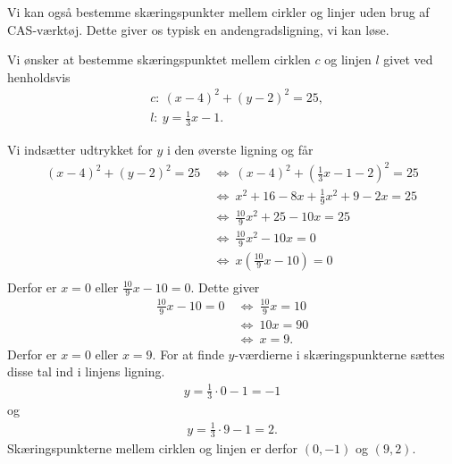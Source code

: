 Vi kan også bestemme skæringspunkter mellem cirkler og linjer uden brug af CAS-værktøj. Dette giver os typisk en andengradsligning, vi kan løse.
\begin{exa}
	Vi ønsker at bestemme skæringspunktet mellem cirklen $c$ og linjen $l$ givet ved henholdsvis
	\begin{align*}
		&c: \ (x - 4)^2 + (y - 2)^2 = 25,\\
		&l: \ y = \frac{1}{3}x - 1.
	\end{align*}
\end{exa}
Vi indsætter udtrykket for $y$ i den øverste ligning og får
\begin{align*}
	(x-4)^2 + (y - 2)^2 = 25 \ &\Leftrightarrow \ (x-4)^2 + (\frac{1}{3}x-1-2)^2 = 25 \\
	&\Leftrightarrow \ x^2 + 16 - 8x + \frac{1}{9}x^2 + 9 - 2x = 25 \\
	&\Leftrightarrow \ \frac{10}{9}x^2 + 25 - 10x = 25 \\
	&\Leftrightarrow	\ \frac{10}{9}x^2 -10x = 0 \\
	&\Leftrightarrow \ x\left(\frac{10}{9}x - 10\right) = 0 \\
\end{align*}
Derfor er $x = 0$ eller $\frac{10}{9}x  - 10 = 0$. Dette giver
\begin{align*}
	\frac{10}{9}x - 10 = 0 \ &\Leftrightarrow \ \frac{10}{9}x = 10 \\
	&\Leftrightarrow	 \ 10x = 90 \\
	&\Leftrightarrow \ x = 9.
\end{align*} 
Derfor er $x = 0$ eller $x = 9$. For at finde $y$-værdierne i skæringspunkterne sættes disse tal ind i linjens ligning. 
\begin{align*}
	y = \frac{1}{3}\cdot 0 - 1 = -1
\end{align*}
og
\begin{align*}
	y = \frac{1}{3} \cdot 9 - 1 = 2.
\end{align*}
Skæringspunkterne mellem cirklen og linjen er derfor $(0,-1)$ og $(9,2)$. 

